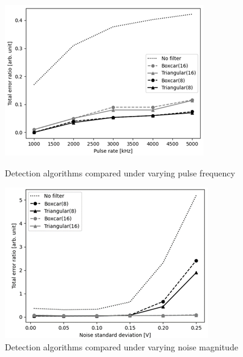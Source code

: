   \begin{figure}[H]
    \centering
    \begin{minipage}{.45\textwidth}
      \centering
      \includegraphics[width=\linewidth]{media/detection_sim_pulse_rate.png}
      \caption{Detection algorithms compared under varying pulse frequency}
      \label{fig:detection_sim_pulse_rate}
    \end{minipage}%
    \hfill
    \begin{minipage}{.45\textwidth}
      \centering
      \includegraphics[width=\linewidth]{media/detection_sim_noise.png}
      \caption{Detection algorithms compared under varying noise magnitude}
      \label{fig:detection_sim_noise}
    \end{minipage}
  \end{figure}
